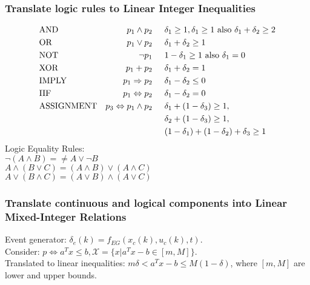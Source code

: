 \documentclass[landscape,a4paper,8pt]{scrartcl}
\begin{document}
\begin{multicols*}{3}
\subsubsection{Translate logic rules to Linear Integer Inequalities}\vspace*{-\baselineskip}
\begin{align*}
&\text{AND} &p_1 \wedge p_2 \hspace*{5mm} &\delta_1 \geq 1, \delta_1 \geq 1\text{ also } \delta_1 + \delta_2 \geq 2 \\
&\text{OR} &p_1 \vee p_2 \hspace*{5mm} &\delta_1 + \delta_2 \geq 1 \\
&\text{NOT} &\neg p_1 \hspace*{5mm} &1-\delta_1 \geq 1 \text{ also } \delta_1 = 0 \\
&\text{XOR} &p_1 + p_2 \hspace*{5mm} &\delta_1 + \delta_2 = 1 \\
&\text{IMPLY} &p_1 \Rightarrow p_2 \hspace*{5mm} &\delta_1 - \delta_2 \leq 0 \\
&\text{IIF} &p_1 \Leftrightarrow p_2 \hspace*{5mm} &\delta_1 - \delta_2 = 0 \\
&\text{ASSIGNMENT} &p_3 \Leftrightarrow p_1 \wedge p_2  \hspace*{5mm} &
\delta_1 + (1 - \delta_3) \geq 1, \\
& & &\delta_2 + (1 - \delta_3) \geq 1, \\
& & &(1 - \delta_1) + (1 - \delta_2) + \delta_3 \geq 1
\end{align*}
Logic Equality Rules: \\
$ \neg (A \wedge B) = \neq A \vee \neg B$\\
$A \wedge (B \vee C) = (A \wedge B) \vee (A\wedge C)$\\
$ A \vee (B \wedge C) = (A\vee B)\wedge (A \vee C)$
\subsubsection{Translate continuous and logical components into Linear Mixed-Integer Relations}
Event generator: $\delta_e(k) = f_{EG}(x_c(k), u_c(k), t)$. \\
Consider: $p \Leftrightarrow a^Tx \leq b, \mathcal X = \{x | a^T x-b \in [m, M]\}$. \\
Translated to linear inequalities: $ m \delta < a^T x-b \leq M(1-\delta)$, where $[m, M]$ are lower and upper bounds. \\

\end{multicols*}
\end{document}
